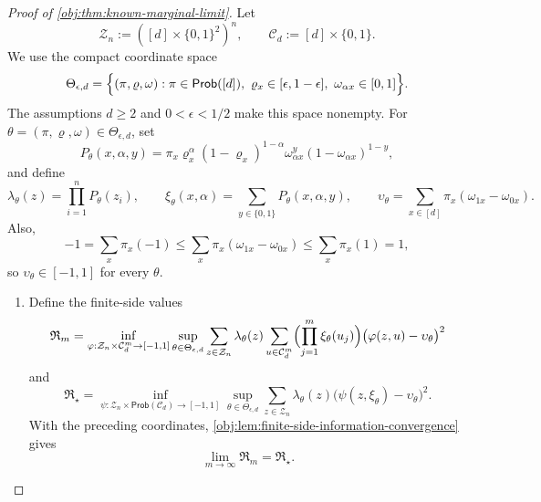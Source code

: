 \documentclass[11pt]{article}
\begin{document}
\begin{proof}[Proof of \cref{obj:thm:known-marginal-limit}]
Let
\[
\mathcal Z_n:=([d]\times\{0,1\}^2)^n,
\qquad
\mathcal C_d:=[d]\times\{0,1\}.
\]
We use the compact coordinate space
\[
\Theta_{\epsilon,d}
=
\Bigl\{(\pi,\varrho,\omega):
\pi\in\mathsf{Prob}([d]),\
\varrho_x\in[\epsilon,1-\epsilon],\
\omega_{\alpha x}\in[0,1]\Bigr\}.
\]
The assumptions \(d\ge2\) and \(0<\epsilon<1/2\) make this space nonempty.  For
\(\theta=(\pi,\varrho,\omega)\in\Theta_{\epsilon,d}\), set
\[
P_\theta(x,\alpha,y)
=
\pi_x\varrho_x^\alpha(1-\varrho_x)^{1-\alpha}
\omega_{\alpha x}^y(1-\omega_{\alpha x})^{1-y},
\]
and define
\[
\lambda_\theta(z)
=
\prod_{i=1}^n P_\theta(z_i),
\qquad
\xi_\theta(x,\alpha)
=
\sum_{y\in\{0,1\}}P_\theta(x,\alpha,y),
\qquad
\upsilon_\theta
=
\sum_{x\in[d]}\pi_x(\omega_{1x}-\omega_{0x}).
\]
Also,
\[
-1
=
\sum_x\pi_x(-1)
\le
\sum_x\pi_x(\omega_{1x}-\omega_{0x})
\le
\sum_x\pi_x(1)
=
1,
\]
so \(\upsilon_\theta\in[-1,1]\) for every \(\theta\). %

\begin{enumerate}
\item\label{pf:known-marginal-limit:finite-side} Define the finite-side values
\[
\mathfrak R_m
=
\inf_{\varphi:\mathcal Z_n\times\mathcal C_d^m\to[-1,1]}
\sup_{\theta\in\Theta_{\epsilon,d}}
\sum_{z\in\mathcal Z_n}\lambda_\theta(z)
\sum_{u\in\mathcal C_d^m}
\Bigl(\prod_{j=1}^m\xi_\theta(u_j)\Bigr)
\bigl(\varphi(z,u)-\upsilon_\theta\bigr)^2
\]
and
\[
\mathfrak R_\star
=
\inf_{\psi:\mathcal Z_n\times\mathsf{Prob}(\mathcal C_d)\to[-1,1]}
\sup_{\theta\in\Theta_{\epsilon,d}}
\sum_{z\in\mathcal Z_n}\lambda_\theta(z)
\bigl(\psi(z,\xi_\theta)-\upsilon_\theta\bigr)^2 .
\]
With the preceding coordinates, \cref{obj:lem:finite-side-information-convergence} gives
\[
\lim_{m\to\infty}\mathfrak R_m=\mathfrak R_\star .
\]


\end{enumerate}
\end{proof}
\end{document}
